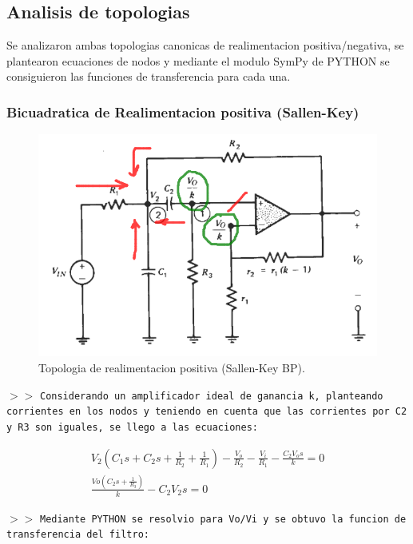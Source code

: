 \subsection{Analisis de topologias}

Se analizaron ambas topologias canonicas de realimentacion positiva/negativa, se plantearon ecuaciones de nodos y mediante el modulo SymPy de PYTHON se consiguieron las funciones de transferencia para cada una.

\subsubsection{Bicuadratica de Realimentacion positiva (Sallen-Key)}

\begin{figure}[H]
    \centering
    \includegraphics[scale=.5]{Secciones/Circ1/img/sallenKeyBP.png}
    \caption{Topologia de realimentacion positiva (Sallen-Key BP).}
    \label{c1}
\end{figure}

\noindent $>>$ \texttt{Considerando un amplificador ideal de ganancia k, planteando corrientes en los nodos y teniendo en cuenta que las corrientes por C2 y R3 son iguales, se llego a las ecuaciones:
}

\begin{align*}
    V_2 \left(C_{1} s + C_{2} s + \frac{1}{R_{2}} + \frac{1}{R_{1}}\right) - \frac{V_o}{R_{2}} - \frac{V_i}{R_{1}} - \frac{C_{2} V_o s}{k} = 0 \\
    \frac{Vo \left(C_{2} s + \frac{1}{R_{3}}\right)}{k} - C_{2} V_2 s = 0 
\end{align*}
    
\noindent $>>$ \texttt{Mediante PYTHON se resolvio para Vo/Vi y se obtuvo la funcion de transferencia del filtro:}

